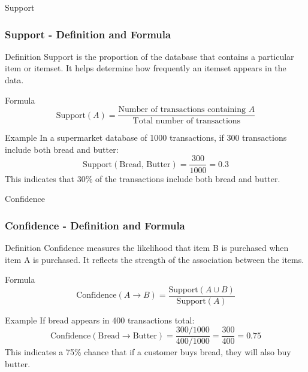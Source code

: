 \documentclass[aspectratio=169]{beamer}
\begin{document}
\begin{frame}[fragile]{Support}
    \frametitle{Support - Definition and Formula}
    \begin{block}{Definition}
        Support is the proportion of the database that contains a particular item or itemset. It helps determine how frequently an itemset appears in the data.
    \end{block}
    
    \begin{block}{Formula}
        \begin{equation}
            \text{Support}(A) = \frac{\text{Number of transactions containing } A}{\text{Total number of transactions}}
        \end{equation}
    \end{block}

    \begin{block}{Example}
        In a supermarket database of 1000 transactions, if 300 transactions include both bread and butter:
        \begin{equation}
            \text{Support}(\text{Bread, Butter}) = \frac{300}{1000} = 0.3
        \end{equation}
        This indicates that 30\% of the transactions include both bread and butter.
    \end{block}
\end{frame}

\begin{frame}[fragile]{Confidence}
    \frametitle{Confidence - Definition and Formula}
    \begin{block}{Definition}
        Confidence measures the likelihood that item B is purchased when item A is purchased. It reflects the strength of the association between the items.
    \end{block}
    
    \begin{block}{Formula}
        \begin{equation}
            \text{Confidence}(A \rightarrow B) = \frac{\text{Support}(A \cup B)}{\text{Support}(A)}
        \end{equation}
    \end{block}

    \begin{block}{Example}
        If bread appears in 400 transactions total:
        \begin{equation}
            \text{Confidence}(\text{Bread} \rightarrow \text{Butter}) = \frac{300/1000}{400/1000} = \frac{300}{400} = 0.75
        \end{equation}
        This indicates a 75\% chance that if a customer buys bread, they will also buy butter.
    \end{block}
\end{frame}
\end{document}
